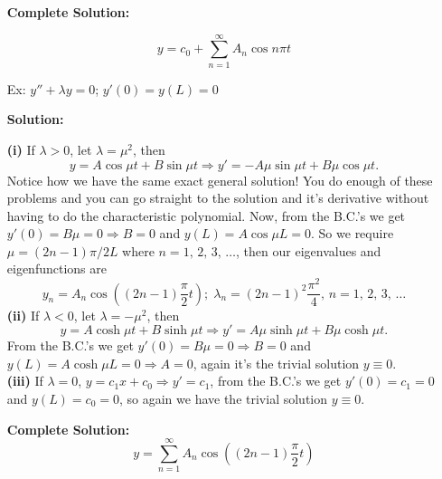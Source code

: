 \documentclass[reqno]{amsart}
\theoremstyle{definition}
\begin{document}
\begin{enumerate}
\textbf{Complete Solution:  }

\begin{equation*}
y = c_0 + \sum_{n=1}^\infty A_n \cos n\pi t
\end{equation*}

\item[Ex:  ]  $y'' + \lambda y = 0$; $y'(0) = y(L) = 0$

\textbf{Solution:  }

\textbf{(i)}  If $\lambda > 0$, let $\lambda = \mu^2$, then
%
\begin{equation*}
y = A\cos\mu t + B\sin\mu t \Rightarrow y' = -A\mu\sin\mu t + B\mu\cos\mu t.
\end{equation*}
%
Notice how we have the same exact general solution!  You do enough of these problems
and you can go straight to the solution and it's derivative without having to do the characteristic
polynomial.  Now, from the B.C.'s we get $y'(0) = B\mu = 0 \Rightarrow B = 0$ and
$y(L) = A\cos\mu L = 0$.  So we require $\mu = (2n-1)\pi/2L$ where $n = 1,\, 2,\, 3,\, \ldots$,
then our eigenvalues and eigenfunctions are
%
\begin{equation*}
y_n = A_n\cos\left((2n-1)\frac{\pi}{2}t\right);\; \lambda_n = (2n-1)^2\frac{\pi^2}{4},\, n = 1,\, 2,\, 3,\, \ldots
\end{equation*}
%
\textbf{(ii)}  If $\lambda < 0$, let $\lambda = -\mu^2$, then
%
\begin{equation*}
y = A\cosh\mu t + B\sinh\mu t \Rightarrow y' = A\mu\sinh\mu t + B\mu\cosh\mu t.
\end{equation*}
%
From the B.C.'s we get $y'(0) = B\mu = 0 \Rightarrow B = 0$ and $y(L) = A\cosh\mu L = 0 \Rightarrow A = 0$,
again it's the trivial solution $y \equiv 0$.\\
%
\textbf{(iii)}  If $\lambda = 0$, $y = c_1x + c_0 \Rightarrow y' = c_1$, from the
B.C.'s we get $y'(0) = c_1 = 0$ and $y(L) = c_0 = 0$, so again we have the trivial
solution $y \equiv 0$.

\textbf{Complete Solution:  }
%
\begin{equation*}
y = \sum_{n=1}^\infty A_n\cos\left((2n-1)\frac{\pi}{2}t\right)
\end{equation*}

\end{enumerate}
\end{document}
